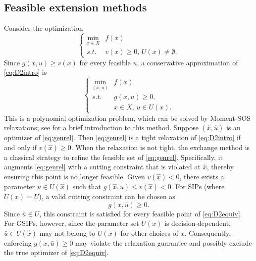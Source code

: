 \documentclass{amsart}
\theoremstyle{plain}
\newcommand{\st}{\mathit{s.t.}}
\numberwithin{equation}{section}
\begin{document}
        \subsection{Feasible extension methods}
        Consider the optimization
	\begin{equation}\label{eq:D2intro}
		\left\{\begin{array}{cl}
			\min\limits_{x\in X} & f(x)\\
			\st &  v(x)\ge 0,\, U(x)\not=\emptyset.
		\end{array}
		\right.
	\end{equation}
	Since $g(x,u)\ge v(x)$ for every feasible $u$, 
        a conservative approximation of \eqref{eq:D2intro} is
	\begin{equation}\label{eq:genrel}
		\left\{\begin{array}{cl}
			\min\limits_{(x,u)} & f(x)\\
			\st & g(x,u)\ge 0,\\
			& x\in X,\, u\in U(x).
		\end{array}
		\right.
	\end{equation}
	This is a polynomial optimization problem, which can be solved by Moment-SOS
   		relaxations; see  for a brief introduction to this method. 
    	Suppose $(\hat{x}, \hat{u})$ is an optimizer of \eqref{eq:genrel}. 
        Then \eqref{eq:genrel} is a tight relaxation of \eqref{eq:D2intro} 
        if and only if $v(\hat{x})\ge 0$. When the relaxation is not tight, 
        the exchange method \cite{BhattachCP76,Cerulli22} is a classical strategy
        to refine the feasible set of \eqref{eq:genrel}.
        Specifically, it augments \eqref{eq:genrel} with a cutting 
        constraint that is violated at $\hat{x}$, 
        thereby ensuring this point is no longer feasible. 
        Given $v(\hat{x})<0$, there exists a parameter $\bar{u}\in U(\hat{x})$ 
        such that $g(\hat{x}, \bar{u})\le v(\hat{x})< 0$. 
        For SIPs (where $U(x)= U$), a valid cutting constraint can be chosen as
	\[ g(x,\bar{u})\ge 0. \]
        Since $\bar{u}\in U$, this constraint is satisfied for every feasible point of \eqref{eq:D2equiv}.
		For GSIPs, however, since the parameter set $U(x)$ is decision-dependent, 
        $\bar{u}\in U(\hat{x})$ may not belong to $U(x)$ for other
        choices of $x$. 
        Consequently, enforcing $g(x,\bar{u})\ge 0$ may violate the relaxation guarantee
        and possibly exclude the true optimizer of \eqref{eq:D2equiv}.
        
\end{document}
